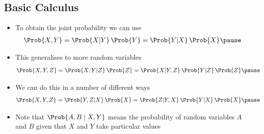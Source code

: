 
\begin{slide}
\section{Basic Calculus}

\begin{PauseHighLight}
  \begin{itemize}
  \item To obtain the joint probability we can use
    \begin{align*}
      \Prob{X,Y} = \Prob{X|Y}\,\Prob{Y} = \Prob{Y|X}\,\Prob{X}\pause
    \end{align*}
  \item This generalises to more random variables
    \begin{align*}
      \Prob{X,Y,Z} = \Prob{X,Y|Z}\, \Prob{Z}
      = \Prob{X|Y,Z}\,\Prob{Y|Z}\,\Prob{Z}\pause
    \end{align*}
  \item We can do this in a number of different ways
    \begin{align*}
      \Prob{X,Y,Z} = \Prob{Y,Z|X}\, \Prob{X}
      = \Prob{Z|Y,X}\,\Prob{Y|X}\,\Prob{X}\pause
    \end{align*}
    \item Note that $\Prob{A,B \mid X,Y}$ means the probability of
      random variables $A$ and $B$ given that $X$ and $Y$ take
      particular values\pause
  \end{itemize}
\end{PauseHighLight}

\end{slide}



